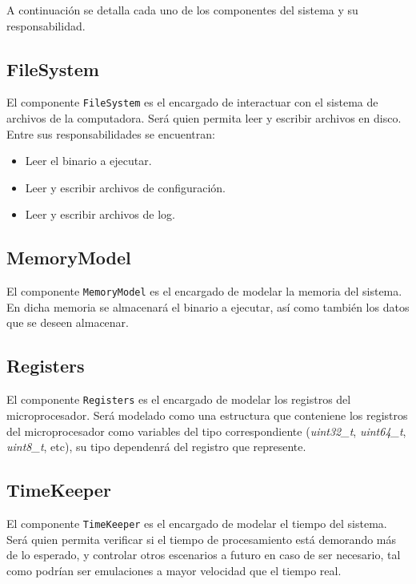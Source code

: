 \documentclass[
  11pt, %
  codirector, %
]{charter}
\begin{document}
\vspace{25px}

A continuación se detalla cada uno de los componentes del sistema y su responsabilidad.

\subsection{FileSystem}

El componente \texttt{FileSystem} es el encargado de interactuar con el sistema de archivos de la computadora. Será quien permita leer y escribir archivos en disco. Entre sus responsabilidades se encuentran:

\begin{itemize}
\item Leer el binario a ejecutar.
\item Leer y escribir archivos de configuración.
\item Leer y escribir archivos de log.
\end{itemize}

\subsection{MemoryModel}

El componente \texttt{MemoryModel} es el encargado de modelar la memoria del sistema. En dicha memoria se almacenará el binario a ejecutar, así como también los datos que se deseen almacenar.

\subsection{Registers}

El componente \texttt{Registers} es el encargado de modelar los registros del microprocesador. Será modelado como una estructura que conteniene los registros del microprocesador como variables del tipo correspondiente (\textit{uint32\_t}, \textit{uint64\_t}, \textit{uint8\_t}, etc), su tipo dependenrá del registro que represente.

\subsection{TimeKeeper}

El componente \texttt{TimeKeeper} es el encargado de modelar el tiempo del sistema. Será quien permita verificar si el tiempo de procesamiento está demorando más de lo esperado, y controlar otros escenarios a futuro en caso de ser necesario, tal como podrían ser emulaciones a mayor velocidad que el tiempo real.
\end{document}
